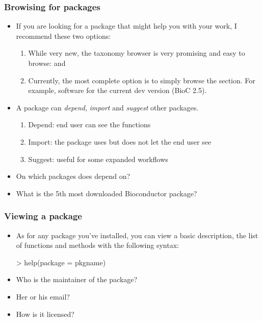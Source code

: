 \begin{frame}[allowframebreaks]
  \frametitle{Browising for packages}
  \begin{itemize}
  \item If you are looking for a package that might help you with your work, I recommend these two options:
  \begin{enumerate}
  \item While very new, the  taxonomy browser is very promising and easy to browse:  and 
  \item Currently, the most complete option is to simply browse the  section. For example, software for the current dev version (BioC 2.5).
  \end{enumerate}
  \item A package can \emph{depend}, \emph{import} and \emph{suggest} other packages.
  \begin{enumerate}
  \item Depend: end user can see the functions
  \item Import: the package uses but does not let the end user see
  \item Suggest: useful for some expanded workflows
  \end{enumerate}
  \item On which packages does  depend on?
  \item What is the 5th most downloaded Bioconductor package?
  \end{itemize}
\end{frame}

\begin{frame}
  \frametitle{Viewing a package}
  \begin{itemize}
  \item As for any package you've installed, you can view a basic description, the list of functions and methods with the following syntax:
\begin{Schunk}
\begin{Sinput}
> help(package = pkgname)
\end{Sinput}
\end{Schunk}
  \item Who is the maintainer of the  package? 
  \item Her or his email?
  \item How is it licensed?
  \end{itemize}
\end{frame}

